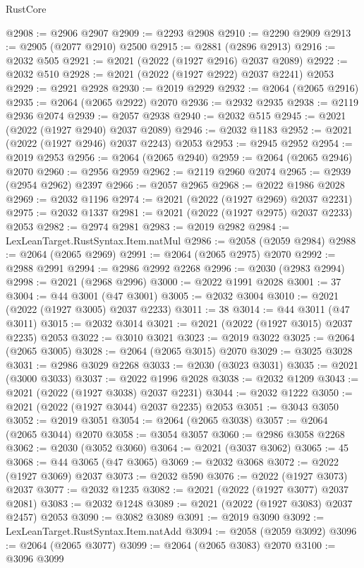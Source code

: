 \begin{lexlean}{RustCore}
\begin{coremodule}
@2908 := @2906 @2907
@2909 := @2293 @2908
@2910 := @2290 @2909
@2913 := @2905 (@2077 @2910) @2500
@2915 := @2881 (@2896 @2913)
@2916 := @2032 @505
@2921 := @2021 (@2022 (@1927 @2916) @2037 @2089)
@2922 := @2032 @510
@2928 := @2021 (@2022 (@1927 @2922) @2037 @2241) @2053
@2929 := @2921 @2928
@2930 := @2019 @2929
@2932 := @2064 (@2065 @2916)
@2935 := @2064 (@2065 @2922) @2070
@2936 := @2932 @2935
@2938 := @2119 @2936 @2074
@2939 := @2057 @2938
@2940 := @2032 @515
@2945 := @2021 (@2022 (@1927 @2940) @2037 @2089)
@2946 := @2032 @1183
@2952 := @2021 (@2022 (@1927 @2946) @2037 @2243) @2053
@2953 := @2945 @2952
@2954 := @2019 @2953
@2956 := @2064 (@2065 @2940)
@2959 := @2064 (@2065 @2946) @2070
@2960 := @2956 @2959
@2962 := @2119 @2960 @2074
@2965 := @2939 (@2954 @2962) @2397
@2966 := @2057 @2965
@2968 := @2022 @1986 @2028
@2969 := @2032 @1196
@2974 := @2021 (@2022 (@1927 @2969) @2037 @2231)
@2975 := @2032 @1337
@2981 := @2021 (@2022 (@1927 @2975) @2037 @2233) @2053
@2982 := @2974 @2981
@2983 := @2019 @2982
@2984 := LexLeanTarget.RustSyntax.Item.natMul
@2986 := @2058 (@2059 @2984)
@2988 := @2064 (@2065 @2969)
@2991 := @2064 (@2065 @2975) @2070
@2992 := @2988 @2991
@2994 := @2986 @2992 @2268
@2996 := @2030 (@2983 @2994)
@2998 := @2021 (@2968 @2996)
@3000 := @2022 @1991 @2028
@3001 := 37
@3004 := @44 @3001 (@47 @3001)
@3005 := @2032 @3004
@3010 := @2021 (@2022 (@1927 @3005) @2037 @2233)
@3011 := 38
@3014 := @44 @3011 (@47 @3011)
@3015 := @2032 @3014
@3021 := @2021 (@2022 (@1927 @3015) @2037 @2235) @2053
@3022 := @3010 @3021
@3023 := @2019 @3022
@3025 := @2064 (@2065 @3005)
@3028 := @2064 (@2065 @3015) @2070
@3029 := @3025 @3028
@3031 := @2986 @3029 @2268
@3033 := @2030 (@3023 @3031)
@3035 := @2021 (@3000 @3033)
@3037 := @2022 @1996 @2028
@3038 := @2032 @1209
@3043 := @2021 (@2022 (@1927 @3038) @2037 @2231)
@3044 := @2032 @1222
@3050 := @2021 (@2022 (@1927 @3044) @2037 @2235) @2053
@3051 := @3043 @3050
@3052 := @2019 @3051
@3054 := @2064 (@2065 @3038)
@3057 := @2064 (@2065 @3044) @2070
@3058 := @3054 @3057
@3060 := @2986 @3058 @2268
@3062 := @2030 (@3052 @3060)
@3064 := @2021 (@3037 @3062)
@3065 := 45
@3068 := @44 @3065 (@47 @3065)
@3069 := @2032 @3068
@3072 := @2022 (@1927 @3069) @2037
@3073 := @2032 @590
@3076 := @2022 (@1927 @3073) @2037
@3077 := @2032 @1235
@3082 := @2021 (@2022 (@1927 @3077) @2037 @2081)
@3083 := @2032 @1248
@3089 := @2021 (@2022 (@1927 @3083) @2037 @2457) @2053
@3090 := @3082 @3089
@3091 := @2019 @3090
@3092 := LexLeanTarget.RustSyntax.Item.natAdd
@3094 := @2058 (@2059 @3092)
@3096 := @2064 (@2065 @3077)
@3099 := @2064 (@2065 @3083) @2070
@3100 := @3096 @3099

\end{coremodule}
\end{lexlean}
